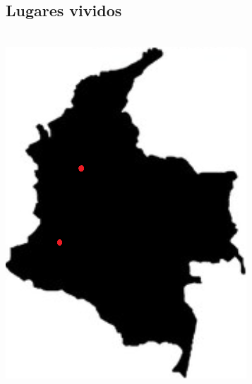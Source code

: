 \documentclass[]{cv-class}
\begin{document}
\begin{aside}
	\section{Lugares vividos}
	\\
	\includegraphics[scale=0.42]{img/colombia-logo.png}
	~
\end{aside}
\end{document}
